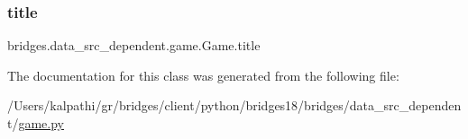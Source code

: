 \mbox{\label{classbridges_1_1data__src__dependent_1_1game_1_1_game_aed1f4f6133e9638c6919badd5628a6e5}} 
\subsubsection{\texorpdfstring{title}{title}}
{\footnotesize\ttfamily bridges.\+data\+\_\+src\+\_\+dependent.\+game.\+Game.\+title}



The documentation for this class was generated from the following file\+:\begin{DoxyCompactItemize}
\item 
/\+Users/kalpathi/gr/bridges/client/python/bridges18/bridges/data\+\_\+src\+\_\+dependent/\mbox{\hyperlink{game_8py}{game.\+py}}\end{DoxyCompactItemize}

